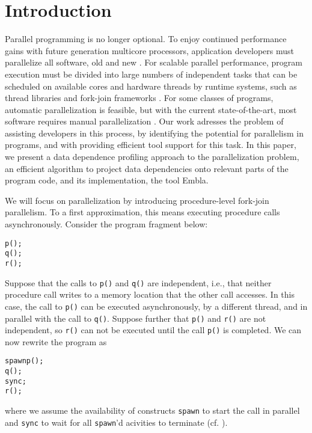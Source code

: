 %

\section{Introduction}

Parallel programming is no longer optional.  To enjoy continued
performance gains with future generation multicore processors,
application developers must parallelize all software, old and new
\cite{TEL95,ONHWC96,KAB03,Sutter05}.  For scalable parallel
performance, program execution must be divided into large numbers of
independent tasks that can be scheduled on available cores and
hardware threads by runtime systems, such as thread libraries and
fork-join frameworks \cite{}.  For some classes of programs, automatic
parallelization is feasible, but with the current state-of-the-art,
most software requires manual parallelization \cite{}.  Our work
adresses the problem of assisting developers in this process, by
identifying the potential for parallelism in programs, and with
providing efficient tool support for this task.  In this paper, we
present a data dependence profiling approach to the parallelization
problem, an efficient algorithm to project data dependencies onto
relevant parts of the program code, and its implementation, the tool
Embla.

We will focus on parallelization by introducing procedure-level
fork-join parallelism.  To a first approximation, this means executing
procedure calls asynchronously.  Consider the program fragment below:
\begin{alltt}
   p();
   q();
   r();
\end{alltt}
Suppose that the calls to {\tt p()} and {\tt q()} are independent,
i.e., that neither procedure call writes to a memory location that the
other call accesses.  In this case, the call to {\tt p()} can be
executed asynchronously, by a different thread, and in parallel with
the call to {\tt q()}.  Suppose further that {\tt p()} and {\tt r()}
are not independent, so {\tt r()} can not be executed until the call
{\tt p()} is completed.  We can now rewrite the program as
\begin{alltt}
   spawn p();
   q();
   sync;
   r();
\end{alltt}
where we assume the availability of constructs {\tt spawn} to start
the call in parallel and {\tt sync} to wait for all {\tt spawn}'d
acivities to terminate (cf. \cite{BJKLR96,frigo98implementation}).

